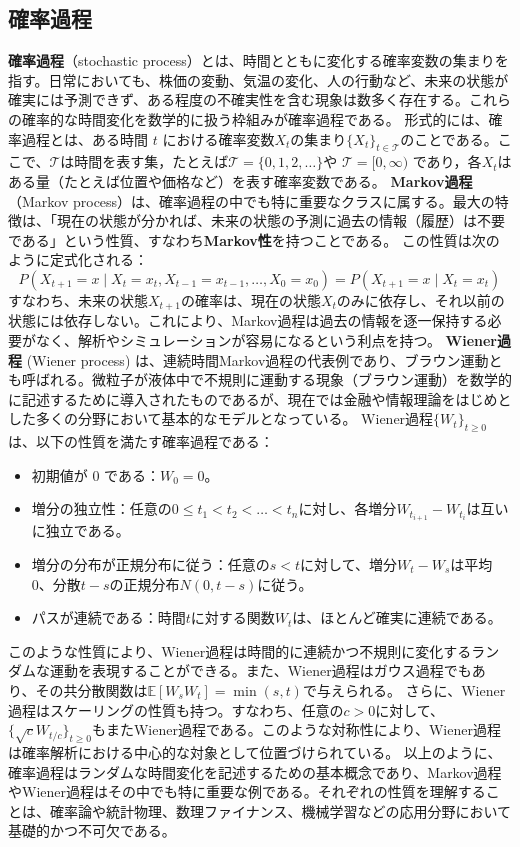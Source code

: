 \subsection{確率過程}
\textbf{確率過程}（stochastic process）とは、時間とともに変化する確率変数の集まりを指す。日常においても、株価の変動、気温の変化、人の行動など、未来の状態が確実には予測できず、ある程度の不確実性を含む現象は数多く存在する。これらの確率的な時間変化を数学的に扱う枠組みが確率過程である。
形式的には、確率過程とは、ある時間 $t$ における確率変数$X_t$の集まり$\{X_t\}_{t \in \mathcal{T}}$のことである。ここで、$\mathcal{T}$は時間を表す集，たとえば$\mathcal{T} = \{0,1,2,\dots\}$や $\mathcal{T} = [0,\infty)$ であり，各$X_t$はある量（たとえば位置や価格など）を表す確率変数である。
\textbf{Markov過程}（Markov process）は、確率過程の中でも特に重要なクラスに属する。最大の特徴は、「現在の状態が分かれば、未来の状態の予測に過去の情報（履歴）は不要である」という性質、すなわち\textbf{Markov性}を持つことである。
この性質は次のように定式化される：
\begin{equation}
P(X_{t+1} = x \mid X_t = x_t, X_{t-1} = x_{t-1}, \dots, X_0 = x_0) = P(X_{t+1} = x \mid X_t = x_t)
\end{equation}
すなわち、未来の状態$X_{t+1}$の確率は、現在の状態$X_t$のみに依存し、それ以前の状態には依存しない。これにより、Markov過程は過去の情報を逐一保持する必要がなく、解析やシミュレーションが容易になるという利点を持つ。
\textbf{Wiener過程} (Wiener process) は、連続時間Markov過程の代表例であり、ブラウン運動とも呼ばれる。微粒子が液体中で不規則に運動する現象（ブラウン運動）を数学的に記述するために導入されたものであるが、現在では金融や情報理論をはじめとした多くの分野において基本的なモデルとなっている。
Wiener過程$\{W_t\}_{t \ge 0}$は、以下の性質を満たす確率過程である：
\begin{itemize}
\item 初期値が 0 である：$W_0 = 0$。
\item 増分の独立性：任意の$0 \le t_1 < t_2 < \dots < t_n$に対し、各増分$W_{t_{i+1}} - W_{t_i}$は互いに独立である。
\item 増分の分布が正規分布に従う：任意の$s < t$に対して、増分$W_t - W_s$は平均 0、分散$t - s$の正規分布$N(0, t - s)$に従う。
\item パスが連続である：時間$t$に対する関数$W_t$は、ほとんど確実に連続である。
\end{itemize}
このような性質により、Wiener過程は時間的に連続かつ不規則に変化するランダムな運動を表現することができる。また、Wiener過程はガウス過程でもあり、その共分散関数は$\mathbb{E}[W_s W_t] = \min(s, t)$で与えられる。
さらに、Wiener過程はスケーリングの性質も持つ。すなわち、任意の$c > 0$に対して、$\{\sqrt{c}W_{t/c}\}_{t \ge 0}$もまたWiener過程である。このような対称性により、Wiener過程は確率解析における中心的な対象として位置づけられている。
以上のように、確率過程はランダムな時間変化を記述するための基本概念であり、Markov過程やWiener過程はその中でも特に重要な例である。それぞれの性質を理解することは、確率論や統計物理、数理ファイナンス、機械学習などの応用分野において基礎的かつ不可欠である。
